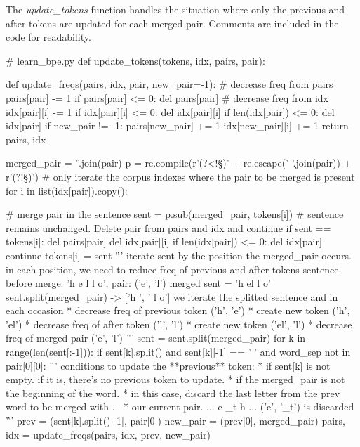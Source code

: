 The \emph{update\_tokens} function handles the situation where only the previous and after tokens are updated for each merged pair. Comments are included in the code for readability.

\begin{python}
# learn_bpe.py
def update_tokens(tokens, idx, pairs, pair):

  def update_freqs(pairs, idx, pair, new_pair=-1):
    # decrease freq from pairs
    pairs[pair] -= 1
    if pairs[pair] <= 0: del pairs[pair]
    # decrease freq from idx
    idx[pair][i] -= 1
    if idx[pair][i] <= 0: del idx[pair][i]
    if len(idx[pair]) <= 0: del idx[pair]
    if new_pair != -1:
      pairs[new_pair] += 1
      idx[new_pair][i] += 1
    return pairs, idx

  merged_pair = ''.join(pair)
  p = re.compile(r'(?<!\S)' + re.escape(' '.join(pair)) + r'(?!\S)')
  # only iterate the corpus indexes where the pair to be merged is present
  for i in list(idx[pair]).copy():

    # merge pair in the sentence
    sent = p.sub(merged_pair, tokens[i])
    # sentence remains unchanged. Delete pair from pairs and idx and continue
    if sent == tokens[i]:
      del pairs[pair]
      del idx[pair][i]
      if len(idx[pair]) <= 0:
        del idx[pair]
      continue
    tokens[i] = sent
    '''
    iterate sent by the position the merged_pair occurs. 
    in each position, we need to reduce freq of previous and after tokens
    sentence before merge: 'h e l l o', pair: ('e', 'l')
    merged sent = 'h el l o'
    sent.split(merged_pair) -> ['h ', ' l o']
    we iterate the splitted sentence and in each occasion
    * decrease freq of previous token ('h', 'e')
        * create new token ('h', 'el')
    * decrease freq of after token ('l', 'l')
        * create new token ('el', 'l')
    * decrease freq of merged pair ('e', 'l')
    '''
    sent = sent.split(merged_pair)
    for k in range(len(sent[:-1])):
      if sent[k].split() and sent[k][-1] == ' ' and word_sep not in pair[0][0]:
        '''
        conditions to update the **previous** token:
        * if sent[k] is not empty. if it is, there's no previous token to update.
        * if the merged_pair is not the beginning of the word.
          * in this case, discard the last letter from the prev word to be merged with ...
          * our current pair. ... e _t h ... ('e', '_t') is discarded
        '''
        prev = (sent[k].split()[-1], pair[0])
        new_pair = (prev[0], merged_pair)
        pairs, idx = update_freqs(pairs, idx, prev, new_pair)


\end{python}
